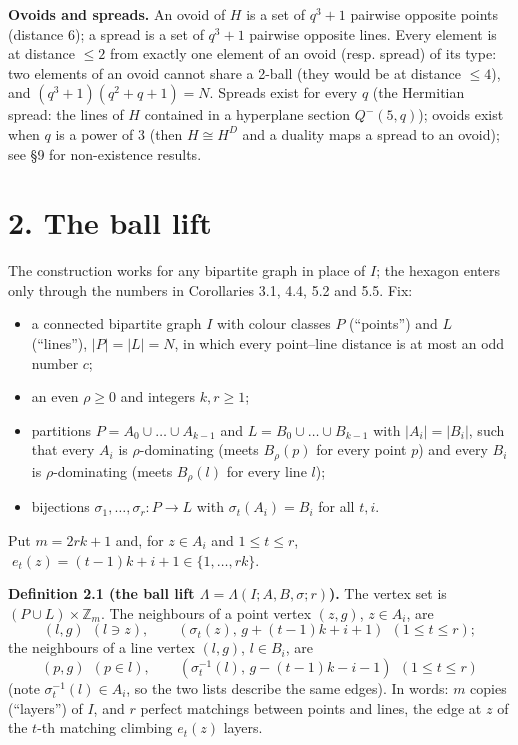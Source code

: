 \documentclass[
  10pt,
]{article}
\providecommand{\tightlist}{%
  \setlength{\itemsep}{0pt}\setlength{\parskip}{0pt}}
\begin{document}
\textbf{Ovoids and spreads.} An ovoid of \(H\) is a set of \(q^3+1\)
pairwise opposite points (distance 6); a spread is a set of \(q^3+1\)
pairwise opposite lines. Every element is at distance \(\le 2\) from
exactly one element of an ovoid (resp. spread) of its type: two elements
of an ovoid cannot share a 2-ball (they would be at distance \(\le 4\)),
and \((q^3+1)(q^2+q+1) = N\). Spreads exist for every \(q\) (the
Hermitian spread: the lines of \(H\) contained in a hyperplane section
\(Q^-(5,q)\)); ovoids exist when \(q\) is a power of 3 (then
\(H\cong H^D\) and a duality maps a spread to an ovoid); see §9 for
non-existence results.

\hypertarget{the-ball-lift}{%
\section{2. The ball lift}\label{the-ball-lift}}

The construction works for any bipartite graph in place of \(I\); the
hexagon enters only through the numbers in Corollaries 3.1, 4.4, 5.2 and
5.5. Fix:

\begin{itemize}
\tightlist
\item
  a connected bipartite graph \(I\) with colour classes \(P\)
  (``points'') and \(L\) (``lines''), \(|P| = |L| = N\), in which every
  point--line distance is at most an odd number \(c\);
\item
  an even \(\rho\ge 0\) and integers \(k, r\ge 1\);
\item
  partitions \(P = A_0\cup\dots\cup A_{k-1}\) and
  \(L = B_0\cup\dots\cup B_{k-1}\) with \(|A_i| = |B_i|\), such that
  every \(A_i\) is \(\rho\)-dominating (meets \(B_\rho(p)\) for every
  point \(p\)) and every \(B_i\) is \(\rho\)-dominating (meets
  \(B_\rho(l)\) for every line \(l\));
\item
  bijections \(\sigma_1,\dots,\sigma_r : P\to L\) with
  \(\sigma_t(A_i) = B_i\) for all \(t, i\).
\end{itemize}

Put \(m = 2rk+1\) and, for \(z\in A_i\) and \(1\le t\le r\),
\(\;e_t(z) = (t-1)k + i + 1\in\{1,\dots,rk\}\).

\textbf{Definition 2.1 (the ball lift
\(\Lambda = \Lambda(I;A,B,\sigma;r)\)).} The vertex set is
\((P\cup L)\times\mathbb Z_m\). The neighbours of a point vertex
\((z,g)\), \(z\in A_i\), are
\[(l,g)\ \ (l\ni z), \qquad (\sigma_t(z),\, g + (t-1)k + i + 1)\ \ (1\le t\le r);\]
the neighbours of a line vertex \((l,g)\), \(l\in B_i\), are
\[(p,g)\ \ (p\in l),\qquad (\sigma_t^{-1}(l),\, g - (t-1)k - i - 1)\ \ (1\le t\le r)\]
(note \(\sigma_t^{-1}(l)\in A_i\), so the two lists describe the same
edges). In words: \(m\) copies (``layers'') of \(I\), and \(r\) perfect
matchings between points and lines, the edge at \(z\) of the \(t\)-th
matching climbing \(e_t(z)\) layers.
\end{document}
